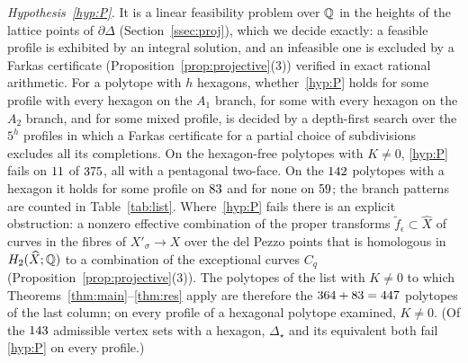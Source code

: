 \emph{Hypothesis~\ref{hyp:P}.} It is a linear feasibility problem over $\mathbb Q$ in the heights of the lattice points of
$\partial\Delta$ (Section~\ref{ssec:proj}), which we decide exactly: a feasible profile is exhibited by an integral
solution, and an infeasible one is excluded by a Farkas certificate (Proposition~\ref{prop:projective}(3)) verified in exact
rational arithmetic. For a polytope with
$h$ hexagons, whether~\ref{hyp:P} holds for some profile with every hexagon on the $A_1$ branch, for some with every
hexagon on the $A_2$ branch, and for some mixed profile, is decided by a depth-first search over the $5^h$ profiles in
which a Farkas certificate for a partial choice of subdivisions excludes all its completions. On the hexagon-free polytopes with $K\ne0$, \ref{hyp:P} fails on
$11$ of $375$, all with a pentagonal two-face. On the $142$ polytopes with a hexagon it holds for some profile
on $83$ and for none on $59$; the branch patterns are counted in Table~\ref{tab:list}. Where~\ref{hyp:P} fails there is an explicit obstruction: a nonzero effective combination of
the proper transforms $\tilde f_\epsilon\subset\widehat X$ of curves in the fibres of $X'_\sigma\to X$ over the del Pezzo
points that is homologous in $H_2(\widehat X;\mathbb Q)$ to a combination of the exceptional curves $C_q$
(Proposition~\ref{prop:projective}(3)). The
polytopes of the list with $K\neq0$ to which Theorems~\ref{thm:main}--\ref{thm:res} apply are therefore the
$364+83=447$ polytopes of the last column; on every profile of a hexagonal polytope examined, $K\ne0$. (Of the $143$ admissible vertex sets with a hexagon, $\Delta_\star$ and its equivalent both fail
\ref{hyp:P} on every profile.)

